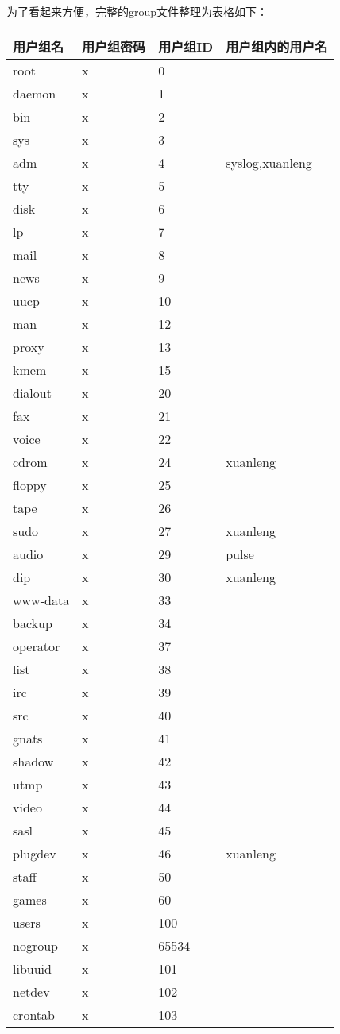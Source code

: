 {\newpage
为了看起来方便，完整的group文件整理为表格如下：\\
{\liuhao
\begin{center}
\begin{longtable}{|l|l|l|l|}
用户组名&用户组密码&用户组ID&用户组内的用户名\\
\hline
root&x&0&\\
daemon&x&1&\\
bin&x&2&\\
sys&x&3&\\
adm&x&4&syslog,xuanleng\\
tty&x&5&\\
disk&x&6&\\
lp&x&7&\\
mail&x&8&\\
news&x&9&\\
uucp&x&10&\\
man&x&12&\\
proxy&x&13&\\
kmem&x&15&\\
dialout&x&20&\\
fax&x&21&\\
voice&x&22&\\
cdrom&x&24&xuanleng\\
floppy&x&25&\\
tape&x&26&\\
sudo&x&27&xuanleng\\
audio&x&29&pulse\\
dip&x&30&xuanleng\\
www-data&x&33&\\
backup&x&34&\\
operator&x&37&\\
list&x&38&\\
irc&x&39&\\
src&x&40&\\
gnats&x&41&\\
shadow&x&42&\\
utmp&x&43&\\
video&x&44&\\
sasl&x&45&\\
plugdev&x&46&xuanleng\\
staff&x&50&\\
games&x&60&\\
users&x&100&\\
nogroup&x&65534&\\
libuuid&x&101&\\
netdev&x&102&\\
crontab&x&103&\\

\end{longtable}
\end{center}}}
